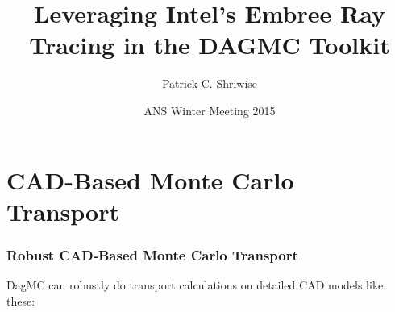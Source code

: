 \documentclass[12pt]{beamer}
\title{Leveraging Intel's Embree Ray Tracing in the DAGMC Toolkit}
\author{Patrick C. Shriwise}
\institute{University of Wisconsin - Madison}
\date{ANS Winter Meeting 2015}
\begin{document}
\frame{\titlepage \addtocounter{framenumber}{-1}}



\section{CAD-Based Monte Carlo Transport} %
\begin{frame}

\frametitle{Robust CAD-Based Monte Carlo Transport}

DagMC can robustly do transport calculations on detailed CAD models like these:


\begin{center}
\begin{tabular}{c c}


\end{tabular}
\end{center}
\end{frame}
\end{document}
